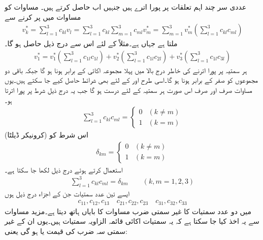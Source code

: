 عددی سر  چند اہم تعلقات پر پورا اترے ہیں جنہیں اب حاصل کرتے ہیں۔ مساوات  کو مساوات  میں پر کرنے سے
\begin{align}\label{مساوات_الاحصاء_تبادل_نظام_ٹ}
v_k^*=\sum_{l=1}^3 c_{kl}v_l=\sum_{l=1}^3 c_{kl}\sum_{m=1}^3 c_{ml} v_m^*=\sum_{m=1}^3 v_m^* \left(\sum_{l=1}^3 c_{kl}c_{ml}\right)
\end{align}
ملتا ہے جہاں  ہے۔مثلاً  کے لئے اس سے درج ذیل حاصل ہو گا۔
\begin{align*}
v_1^*= v_1^*\left(\sum_{l=1}^3 c_{1l}c_{1l}\right)+v_2^*\left(\sum_{l=1}^3 c_{1l}c_{2l}\right)+v_3^*\left(\sum_{l=1}^3 c_{1l}c_{3l}\right)
\end{align*}
ہر سمتیہ  پر پورا اترنے کی خاطر درج بالا میں پہلا مجموعہ اکائی کے برابر ہونا ہو گا جبکہ باقی دو مجموعوں کو صفر کے برابر ہونا ہو گا۔اسی طرح  اور  کے لئے بھی شرائط حاصل کیے جا سکتے ہیں۔یوں  مساوات  صرف اور صرف اس صورت ہر سمتیہ کے لئے درست ہو گا جب یہ درج ذیل شرط پر پورا اترتا ہو۔
\begin{align}\label{مساوات_الاحصاء_عددی_سر_شرط_الف}
\sum_{l=1}^3 c_{kl}c_{ml}=
\begin{cases}
0 & (k \ne m)\\
1& (k=m)
\end{cases}
\end{align}
اس شرط کو  (کرونیکر ڈیلٹا) 
\begin{align*}
\delta_{km}=
\begin{cases}
0&(k\ne m)\\
1&(k=m)
\end{cases}
\end{align*}
استعمال کرتے ہوئے درج ذیل لکھا جا سکتا ہے۔
\begin{align}\label{مساوات_الاحصاء_کرونیکر_الف}
\sum_{l=1}^3 c_{kl}c_{ml}=\delta_{km}\quad \quad (k,m=1,2,3)
\end{align}
ایسے تین عدد سمتیات جن کے اجزاء درج ذیل ہوں
\begin{align*}
c_{11}, c_{12}, c_{13}\quad c_{21}, c_{22}, c_{23} \quad c_{31}, c_{32}, c_{33}
\end{align*}
میں دو عدد سمتیات کا غیر سمتی ضرب مساوات  کا بایاں ہاتھ دیتا ہے۔مزید مساوات  سے یہ اخذ کیا جا سکتا ہے کہ یہ سمتیات اکائی قائمہ الزاویہ سمتیات ہیں۔یوں ان کے غیر سمتی سہ ضرب کی قیمت  یا  ہو گی یعنی:
